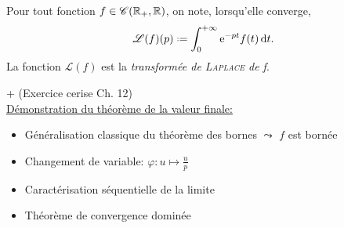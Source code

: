 \begin{defi}
    Pour tout fonction $f \in \mathscr{C}(\mathbb{R}_+, \mathbb{R})$, on note, lorsqu'elle converge, 
    $$\mathscr{L}(f)(p) \defeq \int_{0}^{+ \infty} \me^{-pt} f(t) \d t.$$
    La fonction $\mathscr{L}(f)$ est la \emph{transformée de \textsc{Laplace} de f}.
\end{defi}

\cite{exos_oraux} + \cite{acamanes} (Exercice cerise Ch. 12) \\
\underline{Démonstration du théorème de la valeur finale:}
\begin{itemize}
    \item Généralisation classique du théorème des bornes $\leadsto$ $f$ est bornée
    \item Changement de variable: $\varphi: u \mapsto \frac{u}{p}$
    \item Caractérisation séquentielle de la limite
    \item Théorème de convergence dominée
\end{itemize}
